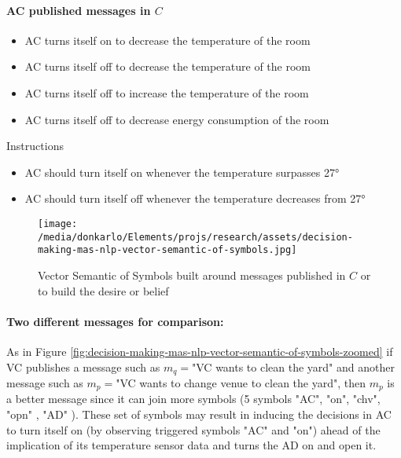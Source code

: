 \documentclass{article}
\begin{document}
\begin{multicols}{2}
			\paragraph{AC published messages in $C$}
				\begin{itemize}
					\item AC turns itself on to decrease the temperature of the room
					\item AC turns itself off to decrease the temperature of the room
					\item AC turns itself off to increase the temperature of the room
					\item AC turns itself off to decrease energy consumption of the room
				\end{itemize}
				Instructions
				\begin{itemize}
					\item AC should turn itself on whenever the temperature surpasses \ang{27}
					\item AC should turn itself off whenever the temperature decreases from \ang{27}
				\end{itemize}
				\begin{figure*}
					\centering
					\texttt{[image: /media/donkarlo/Elements/projs/research/assets/decision-making-mas-nlp-vector-semantic-of-symbols.jpg]}
					\caption{Vector Semantic of Symbols built around messages published in $C$ or to build the desire or belief}
					\label{fig:decision-making-mas-nlp-vector-semantic-of-symbols}
				\end{figure*}
			\paragraph{Two different messages for comparison:} As in Figure \ref{fig:decision-making-mas-nlp-vector-semantic-of-symbols-zoomed} if VC publishes a message such as $m_q=$"VC wants to clean the yard" and another message such as $m_p=$"VC wants to change venue to clean the yard", then $m_p$ is a better message since it can join more symbols (5 symbols "AC", "on", "chv", "opn" , "AD" ). These set of symbols may result in inducing the decisions in AC to turn itself on (by observing triggered symbols "AC" and "on") ahead of the implication of its temperature sensor data and turns the AD on and open it.

\end{multicols}
\end{document}
